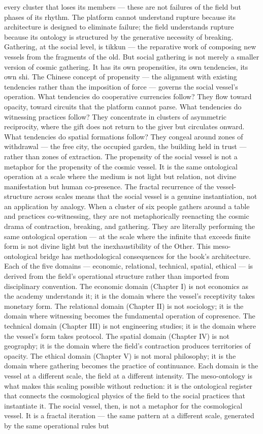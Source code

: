 every cluster that loses its members — these are not failures of the field but phases of its rhythm. The platform cannot understand rupture because its architecture is designed to eliminate failure; the field understands rupture because its ontology is structured by the generative necessity of breaking. Gathering, at the social level, is tikkun — the reparative work of composing new vessels from the fragments of the old. But social gathering is not merely a smaller version of cosmic gathering. It has its own propensities, its own tendencies, its own shi. The Chinese concept of propensity — the alignment with existing tendencies rather than the imposition of force — governs the social vessel’s operation. What tendencies do cooperative currencies follow? They flow toward opacity, toward circuits that the platform cannot parse. What tendencies do witnessing practices follow? They concentrate in clusters of asymmetric reciprocity, where the gift does not return to the giver but circulates onward. What tendencies do spatial formations follow? They congeal around zones of withdrawal — the free city, the occupied garden, the building held in trust — rather than zones of extraction. The propensity of the social vessel is not a metaphor for the propensity of the cosmic vessel. It is the same ontological operation at a scale where the medium is not light but relation, not divine manifestation but human co-presence. The fractal recurrence of the vessel-structure across scales means that the social vessel is a genuine instantiation, not an application by analogy. When a cluster of six people gathers around a table and practices co-witnessing, they are not metaphorically reenacting the cosmic drama of contraction, breaking, and gathering. They are literally performing the same ontological operation — at the scale where the infinite that exceeds finite form is not divine light but the inexhaustibility of the Other. This meso-ontological bridge has methodological consequences for the book’s architecture. Each of the five domains — economic, relational, technical, spatial, ethical — is derived from the field’s operational structure rather than imported from disciplinary convention. The economic domain (Chapter I) is not economics as the academy understands it; it is the domain where the vessel’s receptivity takes monetary form. The relational domain (Chapter II) is not sociology; it is the domain where witnessing becomes the fundamental operation of copresence. The technical domain (Chapter III) is not engineering studies; it is the domain where the vessel’s form takes protocol. The spatial domain (Chapter IV) is not geography; it is the domain where the field’s contraction produces territories of opacity. The ethical domain (Chapter V) is not moral philosophy; it is the domain where gathering becomes the practice of continuance. Each domain is the vessel at a different scale, the field at a different intensity. The meso-ontology is what makes this scaling possible without reduction: it is the ontological register that connects the cosmological physics of the field to the social practices that instantiate it. The social vessel, then, is not a metaphor for the cosmological vessel. It is a fractal iteration — the same pattern at a different scale, generated by the same operational rules but 